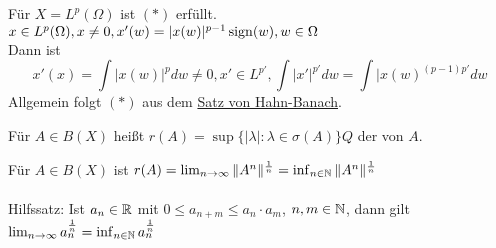 \begin{bemerkung} \label{bem:13.7}
	Für $X = L^{p}(\Omega)$ ist \hyperref[eq:13.6.5-DualAbbildungAuf0]{$(*)$} erfüllt. $x \in L^{p}(\Omega), x \neq 0, x'(w) = |x(w)|^{p-1} \operatorname{sign}(w), w \in \Omega$ \\
	Dann ist 
	\[ x'(x) = \int | x(w) |^{p} dw \neq 0, x' \in L^{p'}, \int |x'|^{p'} dw = \int |x(w)^{(p-1)p'} dw \]
	Allgemein folgt \hyperref[eq:13.6.5-DualAbbildungAuf0]{$(*)$} aus dem \hyperref[satz:20.2-HahnBanach]{Satz von Hahn-Banach}. 
\end{bemerkung}


\begin{definition} \label{def:13.8-Spektralradius}
	Für $A \in B(X)$ hei{\ss}t $r(A) = \sup \{ | \lambda |: \lambda \in \sigma(A) \}Q$ der  von $A$.
\end{definition}


\begin{satz} \label{satz:13.9}
	Für $A \in B(X)$ ist $r(A) = \lim_{n \rightarrow \infty} \| A^{n} \|^{\frac{1}{n}} = \inf_{n \in \mathbb{N}} \| A^{n} \|^{\frac{1}{n}}$ \\ \\
	Hilfssatz: Ist $a_{n} \in \mathbb{R}$ mit $0 \leq a_{n + m} \leq a_{n} \cdot a_{m}$, $n,m \in \mathbb{N}$, dann gilt $\lim_{n \rightarrow \infty} a_{n}^{\frac{1}{n}} = \inf_{n \in \mathbb{N}} a_{n}^{\frac{1}{n}}$
\end{satz}

